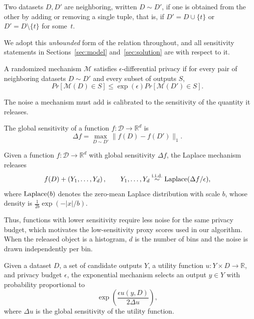 \begin{definition}
\label{def:neighboring}
Two datasets $D,D'$ are neighboring, written $D\sim D'$, if one is obtained
from the other by adding or removing a single tuple, that is, if
$D'=D\cup\{t\}$ or $D'=D\setminus\{t\}$ for some~$t$.
\end{definition}

We adopt this \emph{unbounded} form of the relation throughout, and all sensitivity
statements in Sections~\ref{sec:model} and~\ref{sec:solution} are with respect to
it.

\begin{definition}
A randomized mechanism $\mathcal{M}$ satisfies $\epsilon$-differential privacy if for
every pair of neighboring datasets $D\sim D'$ and every subset of outputs $S$,
\[
Pr[\mathcal{M}(D)\in S]
\leq
\exp(\epsilon)
Pr[\mathcal{M}(D')\in S].
\]
\end{definition}

The noise a mechanism must add is calibrated to the sensitivity of the quantity it
releases.

\begin{definition}
\label{def:global-sensitivity}
The global sensitivity of a function $f:\mathcal{D}\rightarrow\mathbb{R}^d$ is
\[
\Delta f
=
\max_{D\sim D'}
\|f(D)-f(D')\|_1 .
\]
\end{definition}

\begin{definition}
Given a function $f:\mathcal{D}\rightarrow\mathbb{R}^d$ with global sensitivity
$\Delta f$, the Laplace mechanism releases
\[
f(D)+\left(Y_1,\ldots,Y_d\right),
\qquad
Y_1,\ldots,Y_d \stackrel{\text{i.i.d.}}{\sim} \operatorname{Laplace}(\Delta f/\epsilon),
\]
where $\operatorname{Laplace}(b)$ denotes the zero-mean Laplace distribution with scale $b$, whose
density is $\frac{1}{2b}\exp(-|x|/b)$.
\end{definition}

Thus, functions with lower sensitivity require less noise for the same
privacy budget, which motivates the low-sensitivity proxy scores used in
our algorithm.
When the released object is a histogram, $d$ is the number of bins and the noise is
drawn independently per bin.

\begin{definition}
Given a dataset $D$, a set of candidate outputs $Y$, a utility function
$u:Y\times D\rightarrow\mathbb{R}$, and privacy budget $\epsilon$, the exponential
mechanism selects an output $y\in Y$ with probability proportional to
\[
\exp\left(
\frac{\epsilon u(y,D)}
{2\Delta u}
\right),
\]
where $\Delta u$ is the global sensitivity of the utility function.
\end{definition}


